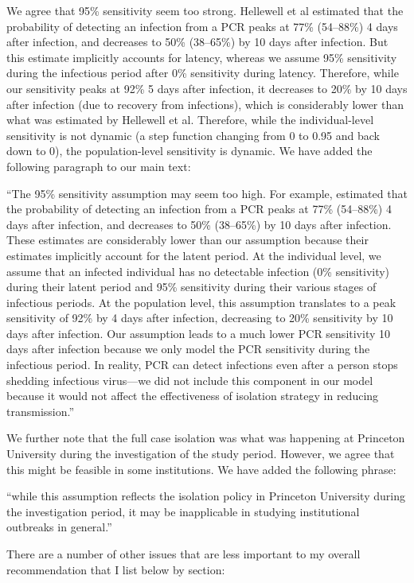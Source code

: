 \documentclass[12pt]{article}
\newcommand{\revtext}{\textsf}
\begin{document}
We agree that 95\% sensitivity seem too strong.
Hellewell et al estimated that the probability of detecting an infection from a PCR peaks at 77\% (54–88\%) 4 days after infection, and decreases to 50\% (38–65\%) by 10 days after infection.
But this estimate implicitly accounts for latency, whereas we assume 95\% sensitivity during the infectious period after 0\% sensitivity during latency.
Therefore, while our sensitivity peaks at 92\% 5 days after infection, it decreases to 20\% by 10 days after infection (due to recovery from infections), which is considerably lower than what was estimated by Hellewell et al.
Therefore, while the individual-level sensitivity is not dynamic (a step function changing from 0 to 0.95 and back down to 0), the population-level sensitivity is dynamic.
We have added the following paragraph to our main text:

``The 95\% sensitivity assumption may seem too high. 
For example, \cite{hellewell2021estimating} estimated that the probability of detecting an infection from a PCR peaks at 77\% (54–88\%) 4 days after infection, and decreases to 50\% (38–65\%) by 10 days after infection.
These estimates are considerably lower than our assumption because their estimates implicitly account for the latent period.
At the individual level, we assume that an infected individual has no detectable infection (0\% sensitivity) during their latent period and 95\% sensitivity during their various stages of infectious periods.
At the population level, this assumption translates to a peak sensitivity of 92\% by 4 days after infection, decreasing to 20\% sensitivity by 10 days after infection.
Our assumption leads to a much lower PCR sensitivity 10 days after infection because we only model the PCR sensitivity during the infectious period.
In reality, PCR can detect infections even after a person stops shedding infectious virus---we did not include this component in our model because it would not affect the effectiveness of isolation strategy in reducing transmission.''

We further note that the full case isolation was what was happening at Princeton University during the investigation of the study period.
However, we agree that this might be feasible in some institutions. We have added the following phrase:

``while this assumption reflects the isolation policy in Princeton University during the investigation period, it may be inapplicable in studying institutional outbreaks in general.''

\revtext{There are a number of other issues that are less important to my overall recommendation that I list below by section:}
\end{document}
